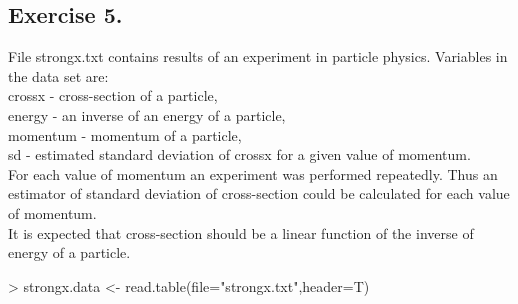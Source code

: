 \documentclass[a4paper]{article}
\begin{document}
\subsection{Exercise 5.} File strongx.txt contains results of an experiment in
particle physics. Variables in the data set are:\\
crossx - cross-section of a particle,\\
energy - an inverse of an energy of a particle,\\
momentum - momentum of a particle,\\
sd - estimated standard deviation of crossx for a given value of momentum.\\
For each value of momentum an experiment was performed repeatedly. Thus an
estimator of standard deviation of cross-section could be calculated for each
value of momentum.\\
It is expected that cross-section should be a linear function of the inverse of
energy of a particle.
\begin{Schunk}
\begin{Sinput}
> strongx.data <- read.table(file="strongx.txt",header=T)	
\end{Sinput}
\end{Schunk}
\end{document}
